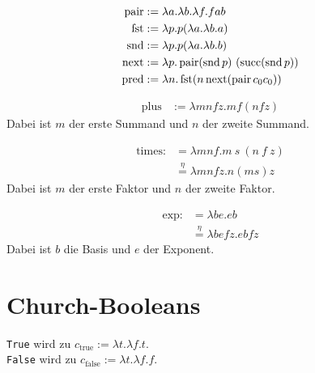 \begin{beispiel}
    \begin{align*}
        \operatorname{pair}&:= \lambda a. \lambda b. \lambda f. f a b\\
        \operatorname{fst} &:= \lambda p. p (\lambda a. \lambda b. a)\\
        \operatorname{snd} &:= \lambda p. p (\lambda a. \lambda b. b)\\
        \operatorname{next} &:= \lambda p. \operatorname{pair} (\operatorname{snd} p)~(\operatorname{succ} (\operatorname{snd} p))\\
        \operatorname{pred}&:= \lambda n. \operatorname{fst} (n \operatorname{next} (\operatorname{pair} c_0 c_0))
    \end{align*}
\end{beispiel}
\begin{beispiel}[Addition]
    \begin{align*}
        \text{plus} &:= \lambda m n f z. m f (n f z)
    \end{align*}
    Dabei ist $m$ der erste Summand und $n$ der zweite Summand.
\end{beispiel}

\begin{beispiel}[Multiplikation]
    \begin{align*}
     \text{times} :&= \lambda m n f. m~s~(n~f~z)\\
                   &\overset{\eta}{=} \lambda m n f z. n (m s) z
    \end{align*}
    Dabei ist $m$ der erste Faktor und $n$ der zweite Faktor.
\end{beispiel}

\begin{beispiel}[Potenz]
    \begin{align*}
     \text{exp} :&= \lambda b e. eb\\
                   &\overset{\eta}{=} \lambda b e f z. e b f z
    \end{align*}
    Dabei ist $b$ die Basis und $e$ der Exponent.
\end{beispiel}

\section{Church-Booleans}
\begin{definition}%
    \texttt{True} wird zu $c_{\text{true}} := \lambda t. \lambda f. t$.\\
    \texttt{False} wird zu $c_{\text{false}} := \lambda t. \lambda f. f$.
\end{definition}

